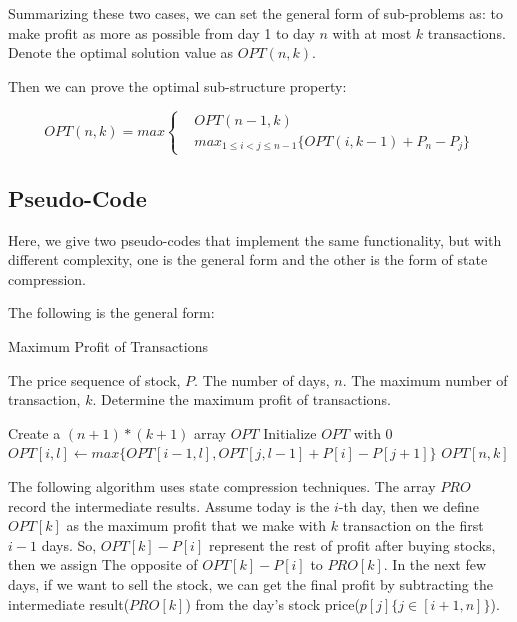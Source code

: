 \documentclass[UTF8,a4paper,12pt]{article}
\begin{document}
\begin{CJK}{UTF8}{gkai}
		Summarizing these two cases, we can set the general form of sub-problems as: to make profit as more as possible from day 1 to day $ n $ with at most $ k $ transactions. Denote the optimal solution value as $ OPT(n, k) $.
		
		Then we can prove the optimal sub-structure property:
	
		$$ OPT(n,k) = max \left\{
		\begin{aligned}
			& OPT(n-1,k)\\
			& max_{1\le{i}<{j}\le{n-1}}\{ OPT(i,k-1) + P_{n} - P_{j}\}
		\end{aligned}
		\right.
		$$
	
	\subsection{Pseudo-Code}
		Here, we give two pseudo-codes that implement the same functionality, but with different complexity, one is the general form and the other is the form of state compression.
		
		The following is the general form:
	\begin{algorithm}[htb]
		\caption{Maximum Profit of Transactions}
		\begin{algorithmic}[1]
			\Require
			The price sequence of stock, $ P $.
			The number of days, $ n $.
			The maximum number of transaction, $k$.
			\Ensure
			Determine the maximum profit of transactions.
			
				\State Create a $ (n+1)*(k+1) $ array $ OPT $
				\State Initialize $ OPT $ with 0
 							\State $ OPT[i,l]  \gets max\{OPT[i-1,l], OPT[j,l-1] + P[i]-P[j+1]\} $
						\EndFor
					\EndFor				
				\EndFor
				\State \Return $ OPT[n,k] $
			\EndFunction
		\end{algorithmic}
	\end{algorithm}

	\newpage
		The following algorithm uses state compression techniques. The array $ PRO $ record the intermediate results. Assume today is the $ i $-th day, then we define $ OPT[k] $ as the maximum profit that we make with $ k $ transaction on the first $ i-1 $ days. So, $ OPT[k]-P[i] $ represent the rest of profit after buying stocks, then we assign The opposite of $ OPT[k]-P[i] $ to $ PRO[k] $. In the next few days, if we want to sell the stock, we can get the final profit by subtracting the intermediate result($ PRO[k] $) from the day's stock price($ p[j]\{j\in[i+1,n]\} $).
		

\end{CJK}
\end{document}
